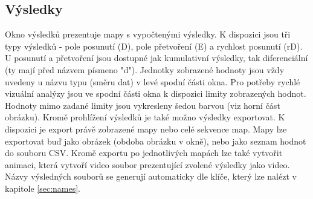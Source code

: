 \documentclass[a4paper,12pt]{article}
\begin{document}
\subsection{Výsledky}
\begin{figure}[H]
\end{figure}
Okno výsledků prezentuje mapy s vypočtenými výsledky. K dispozici jsou tři typy výsledků - pole posunutí (D), pole přetvoření (E) a rychlost posunutí (rD). U posunutí a přetvoření jsou dostupné jak kumulativní výsledky, tak diferenciální (ty mají před názvem písmeno "d"). Jednotky zobrazené hodnoty jsou vždy uvedeny u názvu typu (směru dat) v levé spodní části okna. Pro potřeby rychlé vizuální analýzy jsou ve spodní části okna k dispozici limity zobrazených hodnot. Hodnoty mimo zadané limity jsou vykresleny šedou barvou (viz horní část obrázku). Kromě prohlížení výsledků je také možno výsledky exportovat. K dispozici je export právě zobrazené mapy nebo celé sekvence map. Mapy lze exportovat buď jako obrázek (obdoba obrázku v okně), nebo jako seznam hodnot do souboru CSV. Kromě exportu po jednotlivých mapách lze také vytvořit animaci, která vytvoří video soubor prezentující zvolené výsledky jako video. Názvy výsledných souborů se generují automaticky dle klíče, který lze nalézt v kapitole \ref{sec:names}.
\begin{figure}[H]
\end{figure}
\end{document}
